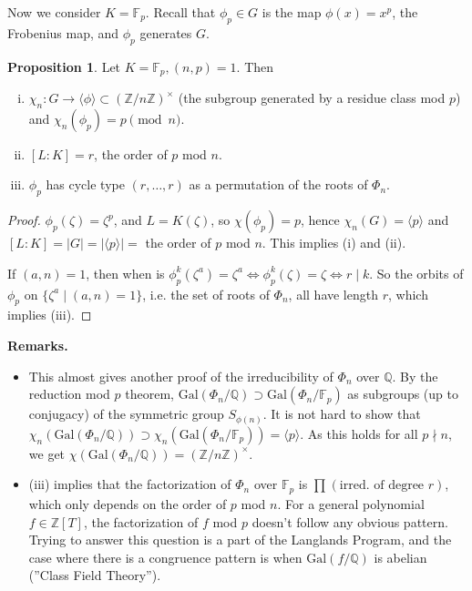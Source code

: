 \documentclass{article}
\theoremstyle{definition}
\newtheorem{prop}[theorem]{Proposition}
\begin{document}
Now we consider $K=\mathbb{F}_p$. Recall that $\phi_p \in G$ is the map $\phi(x)=x^p$, the Frobenius map, and $\phi_p$ generates $G$.
\begin{prop}
    Let $K=\mathbb{F}_p, (n,p)=1$. Then
    \begin{enumerate}[(i)]
        \item $\chi_n : G \to \langle \phi \rangle \subset (\mathbb{Z}/n\mathbb{Z})^\times$ (the subgroup generated by a residue class mod $p$) and $\chi_n(\phi_p)=p \pmod{n}$.
        \item $[L:K]=r$, the order of $p$ mod $n$.
        \item $\phi_p$ has cycle type $(r,\ldots,r)$ as a permutation of the roots of $\Phi_n$.
    \end{enumerate}
\end{prop}
\begin{proof}
    $\phi_p(\zeta)=\zeta^p$, and $L=K(\zeta)$, so $\chi(\phi_p)=p$, hence $\chi_n(G)=\langle p \rangle$ and $[L:K] = |G| = |\langle p \rangle| =$ the order of $p$ mod $n$. This implies (i) and (ii).
    \vspace{1mm}
    
    If $(a,n)=1$, then when is $\phi_p^k(\zeta^a)=\zeta^a \iff \phi_p^k(\zeta)=\zeta \iff r \mid k$. So the orbits of $\phi_p$ on $\{\zeta^a \mid (a,n)=1\}$, i.e. the set of roots of $\Phi_n$, all have length $r$, which implies (iii). 
\end{proof} 
\textbf{Remarks.}
\begin{itemize}
    \item This almost gives another proof of the irreducibility of $\Phi_n$ over $\mathbb{Q}$. By the reduction mod $p$ theorem, $\text{Gal}(\Phi_n/\mathbb{Q}) \supset \text{Gal}(\Phi_n/\mathbb{F}_p)$ as subgroups (up to conjugacy) of the symmetric group $S_{\phi(n)}$. It is not hard to show that $\chi_n(\text{Gal}(\Phi_n/\mathbb{Q})) \supset \chi_n(\text{Gal}(\Phi_n/\mathbb{F}_p)) = \langle p \rangle$. As this holds for all $p \nmid n$, we get $\chi(\text{Gal}(\Phi_n/\mathbb{Q}))=(\mathbb{Z}/n\mathbb{Z})^\times$.
    \item (iii) implies that the factorization of $\Phi_n$ over $\mathbb{F}_p$ is $\prod_{}^{} (\text{irred. of degree }r)$, which only depends on the order of $p$ mod $n$. For a general polynomial $f \in \mathbb{Z}[T]$, the factorization of $f$ mod $p$ doesn't follow any obvious pattern. Trying to answer this question is a part of the Langlands Program, and the case where there is a congruence pattern is when $\text{Gal}(f/\mathbb{Q})$ is abelian (''Class Field Theory'').
\end{itemize}
\end{document}
